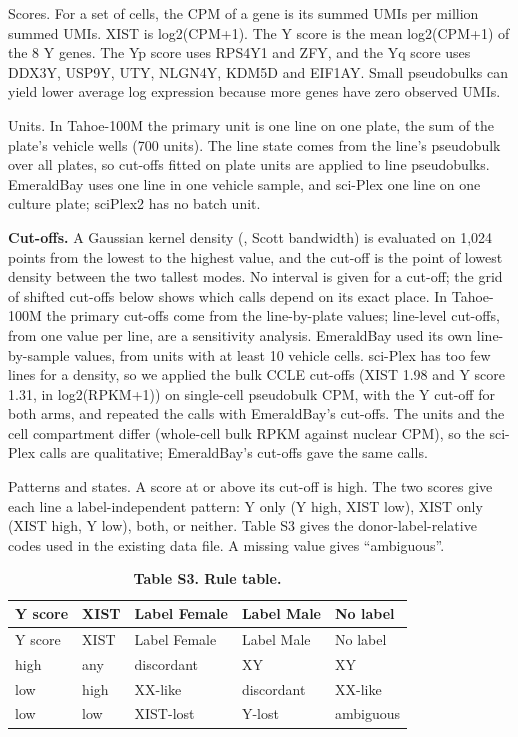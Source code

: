 \documentclass[
  11pt,
  letterpaper,
]{article}
\begin{document}
Scores. For a set of cells, the CPM of a gene is its summed UMIs per
million summed UMIs. XIST is log2(CPM+1). The Y score is the mean
log2(CPM+1) of the 8 Y genes. The Yp score uses RPS4Y1 and ZFY, and the
Yq score uses DDX3Y, USP9Y, UTY, NLGN4Y, KDM5D and EIF1AY. Small
pseudobulks can yield lower average log expression because more genes
have zero observed UMIs.

Units. In Tahoe-100M the primary unit is one line on one plate, the sum
of the plate's vehicle wells (700 units). The line state comes from the
line's pseudobulk over all plates, so cut-offs fitted on plate units are
applied to line pseudobulks. EmeraldBay uses one line in one vehicle
sample, and sci-Plex one line on one culture plate; sciPlex2 has no
batch unit.

\textbf{Cut-offs.} A Gaussian kernel density
(, Scott bandwidth) is evaluated on 1,024
points from the lowest to the highest value, and the cut-off is the
point of lowest density between the two tallest modes. No interval is
given for a cut-off; the grid of shifted cut-offs below shows which
calls depend on its exact place. In Tahoe-100M the primary cut-offs come
from the line-by-plate values; line-level cut-offs, from one value per
line, are a sensitivity analysis. EmeraldBay used its own line-by-sample
values, from units with at least 10 vehicle cells. sci-Plex has too few
lines for a density, so we applied the bulk CCLE cut-offs (XIST 1.98 and
Y score 1.31, in log2(RPKM+1)) on single-cell pseudobulk CPM, with the Y
cut-off for both arms, and repeated the calls with EmeraldBay's
cut-offs. The units and the cell compartment differ (whole-cell bulk
RPKM against nuclear CPM), so the sci-Plex calls are qualitative;
EmeraldBay's cut-offs gave the same calls.

Patterns and states. A score at or above its cut-off is high. The two
scores give each line a label-independent pattern: Y only (Y high, XIST
low), XIST only (XIST high, Y low), both, or neither. Table S3 gives the
donor-label-relative codes used in the existing data file. A missing
value gives ``ambiguous''.

\begin{longtable}[]{@{}lllll@{}}
\caption{\textbf{Table S3. Rule table.}}\tabularnewline
\toprule\noalign{}
Y score & XIST & Label Female & Label Male & No label \\
\midrule\noalign{}
\endfirsthead
\toprule\noalign{}
Y score & XIST & Label Female & Label Male & No label \\
\midrule\noalign{}
\endhead
\bottomrule\noalign{}
\endlastfoot
high & any & discordant & XY & XY \\
low & high & XX-like & discordant & XX-like \\
low & low & XIST-lost & Y-lost & ambiguous \\
\end{longtable}
\end{document}
